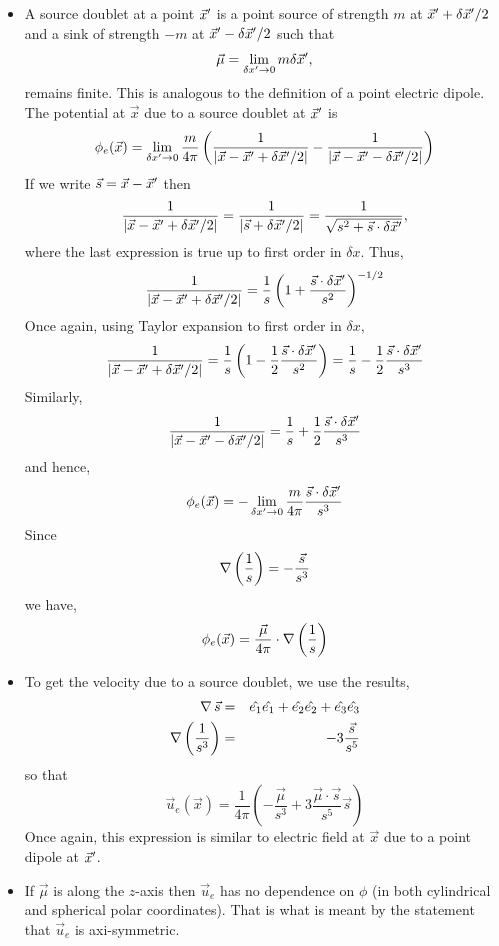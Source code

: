 \begin{itemize}
\item A source doublet at a point $\vec{x}^\prime$ is a point source of strength $m$ at $\vec{x}^\prime + \delta\vec{x}^\prime/2$ and a sink of strength $-m$ at $\vec{x}^\prime - \delta\vec{x}^\prime/2$
such that
\[
\vec{\mu} = \lim_{\delta{x}^\prime \rightarrow 0} m\delta\vec{x}^\prime,
\]
remains finite. This is analogous to the definition of a point electric dipole. The potential at $\vec{x}$ due to a source doublet at $\vec{x}^\prime$ is
\[
\phi_e(\vec{x}) = \lim_{\delta{x}^\prime \rightarrow 0} \frac{m}{4\pi}
\left(\frac{1}{|\vec{x} - \vec{x}^\prime + \delta\vec{x}^\prime/2|} - \frac{1}{|\vec{x} - \vec{x}^\prime - \delta\vec{x}^\prime/2|}\right)
\]
If we write $\vec{s} = \vec{x} - \vec{x}^\prime$ then
\[
\frac{1}{|\vec{x} - \vec{x}^\prime + \delta\vec{x}^\prime/2|} = \frac{1}{|\vec{s} + \delta\vec{x}^\prime/2|} = \frac{1}{\sqrt{s^2 + \vec{s}\cdot\delta\vec{x}^\prime}},
\]
where the last expression is true up to first order in $\delta{x}$. Thus,
\[
\frac{1}{|\vec{x} - \vec{x}^\prime + \delta\vec{x}^\prime/2|} = \frac{1}{s}\left(1 + \frac{\vec{s}\cdot\delta\vec{x}^\prime}{s^2}\right)^{-1/2}
\]
Once again, using Taylor expansion to first order in $\delta{x}$,
\[
\frac{1}{|\vec{x} - \vec{x}^\prime + \delta\vec{x}^\prime/2|} = \frac{1}{s}\left(1 - \frac{1}{2}\frac{\vec{s}\cdot\delta\vec{x}^\prime}{s^2}\right) = 
\frac{1}{s} - \frac{1}{2}\frac{\vec{s}\cdot\delta\vec{x}^\prime}{s^3}
\]
Similarly,
\[
\frac{1}{|\vec{x} - \vec{x}^\prime - \delta\vec{x}^\prime/2|} = \frac{1}{s} + \frac{1}{2}\frac{\vec{s}\cdot\delta\vec{x}^\prime}{s^3}
\]
and hence,
\[
\phi_e(\vec{x}) = -\lim_{\delta{x}^\prime \rightarrow 0} \frac{m}{4\pi}\frac{\vec{s}\cdot\delta\vec{x}^\prime}{s^3}
\]
Since
\[
\operatorname{\nabla}{\left(\frac{1}{s}\right)} = -\frac{\vec{s}}{s^3}
\]
we have,
\[
\phi_e(\vec{x}) = \frac{\vec{\mu}}{4\pi}\cdot\operatorname{\nabla}{\left(\frac{1}{s}\right)}
\]

\item To get the velocity due to a source doublet, we use the results,
\begin{eqnarray*}
\operatorname{\nabla}{\vec{s}} &=& \hat{e_{1}}\hat{e_{1}} + \hat{e_{2}}\hat{e_{2}} + \hat{e_{3}}\hat{e_{3}} \\
\operatorname{\nabla}{\left(\frac{1}{s^3}\right)} &=& -3\frac{\vec{s}}{s^5}
\end{eqnarray*}
so that
\[
\vec{u}_e(\vec{x}) = \frac{1}{4\pi}\left(-\frac{\vec{\mu}}{s^3} + 3 \frac{\vec{\mu}\cdot\vec{s}}{s^5}\vec{s}\right)
\]
Once again, this expression is similar to electric field at $\vec{x}$ due to a point dipole at $\vec{x}^\prime$.

\item If $\vec{\mu}$ is along the $z$-axis then $\vec{u}_e$ has no dependence on $\phi$ (in both cylindrical and spherical polar coordinates). That is what is meant by the statement
that $\vec{u}_e$ is axi-symmetric. 


\end{itemize}
